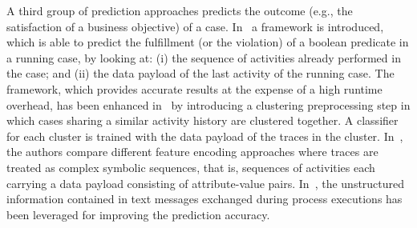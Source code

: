 A third group of prediction approaches predicts the outcome (e.g., the satisfaction of a business objective) of a case. In~\cite{Maggi:CAiSE2014} a framework is introduced, which is able to predict the fulfillment (or the violation) of a boolean predicate in a running case, by looking at: (i) the sequence of activities already performed in the case; and (ii) the data payload of the last activity of the running case. The framework, which provides accurate results at the expense of a high runtime overhead, has been enhanced in~\cite{Di-Francescomarino:2016aa} by introducing a clustering preprocessing step in which cases sharing a similar activity history are clustered together. A classifier for each cluster is trained with the data payload of the traces in the cluster. In~\cite{Leontjeva2015}, the authors compare different feature encoding approaches where traces are treated as complex symbolic sequences, that is, sequences of activities each carrying a data payload consisting of attribute-value pairs. In~\cite{DBLP:conf/bpm/TeinemaaDMF16}, the unstructured information contained in text messages exchanged during process executions has been leveraged for improving the prediction accuracy.

